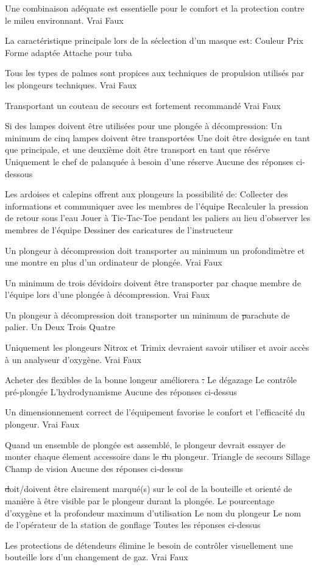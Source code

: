 \documentclass[english,10pt,a4paper,twoside]{article}
\begin{document}
\begin{outline}
		\1 Une combinaison adéquate est essentielle pour le comfort et la protection contre le mileu environnant.
			\2 Vrai
			\2 Faux

		\1 La caractéristique principale lors de la séclection d'un masque est:
			\2 Couleur
			\2 Prix
			\2 Forme adaptée
			\2 Attache pour tuba

		\1 Tous les types de palmes sont propices aux techniques de propulsion utilisés par les plongeurs techniques.
			\2 Vrai
			\2 Faux

		\1 Transportant un couteau de secours est fortement recommandé
			\2 Vrai
			\2 Faux

		\1 Si des lampes doivent être utilisées pour une plongée à décompression:
			\2 Un minimum de cinq lampes doivent être transportées
			\2 Une doit être designée en tant que principale, et une deuxième doit être transport en tant que résérve
			\2 Uniquement le chef de palanquée à besoin d'une réserve
			\2 Aucune des réponses ci-dessous

		\1 Les ardoises et calepins offrent aux plongeurs la possibilité de:
			\2 Collecter des informations et communiquer avec les membres de l'équipe
			\2 Recalculer la pression de retour sous l'eau
			\2 Jouer à Tic-Tac-Toe pendant les paliers au lieu d'observer les membres de l'équipe
			\2 Dessiner des caricatures de l'instructeur

		\1 Un plongeur à décompression doit transporter au minimum un profondimètre et une montre en plus d'un ordinateur de plongée.
			\2 Vrai
			\2 Faux

		\1 Un minimum de trois dévidoirs doivent être transporter par chaque membre de l'équipe lors d'une plongée à décompression.
			\2 Vrai
			\2 Faux

		\1 Un plongeur à décompression doit transporter un minimum de \st parachute de palier.
			\2 Un
			\2 Deux
			\2 Trois
			\2 Quatre

		\1 Uniquement les plongeurs Nitrox et Trimix devraient savoir utiliser et avoir accès à un analyseur d'oxygène.
			\2 Vrai
			\2 Faux

		\1 Acheter des flexibles de la bonne longeur améliorera \st.
			\2 Le dégazage
			\2 Le contrôle pré-plongée
			\2 L'hydrodynamisme
			\2 Aucune des réponses ci-dessus

		\1 Un dimensionnement correct de l'équipement favorise le confort et l'efficacité du plongeur.
			\2 Vrai
			\2 Faux

		\1 Quand un ensemble de plongée est assemblé, le plongeur devrait essayer de monter chaque élement accessoire dans le \st du plongeur.
			\2 Triangle de secours
			\2 Sillage
			\2 Champ de vision
			\2 Aucune des réponses ci-dessus

		\1 \st doit/doivent être clairement marqué(s) sur le col de la bouteille et orienté de manière à être visible par le plongeur durant la plongée.
			\2 Le pourcentage d'oxygène et la profondeur maximum d'utilisation
			\2 Le nom du plongeur
			\2 Le nom de l'opérateur de la station de gonflage
			\2 Toutes les réponses ci-dessus

		\1 Les protections de détendeurs élimine le besoin de contrôler visuellement une bouteille lors d'un changement de gaz.
			\2 Vrai
			\2 Faux
	\end{outline}
\end{document}

